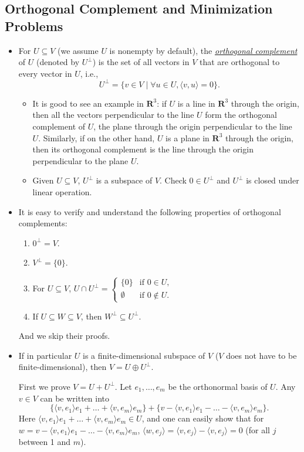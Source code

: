 \documentclass{article}
\newcommand{\df}[1]{\ul{\textit{#1}}}
\newcommand{\R}{\mathbf{R}}
\newcommand{\inp}[2]{\langle #1, #2 \rangle}
\begin{document}
\subsection{Orthogonal Complement and Minimization Problems}
\begin{itemize}
    \item For $U \subseteq V$ (we assume $U$ is nonempty by default), the \df{orthogonal complement} of $U$ (denoted by $U^\perp$) is the set of all vectors in $V$ that are orthogonal to every vector in $U$, i.e., $$U^\perp = \{v \in V \mid \forall u \in U, \inp{v}{u}=0\}.$$
    \begin{itemize}
        \item It is good to see an example in $\R^3$: if $U$ is a line in $\R^3$ through the origin, then all the vectors perpendicular to the line $U$ form the orthogonal complement of $U$, the plane through the origin perpendicular to the line $U$. Similarly, if on the other hand, $U$ is a plane in $\R^3$ through the origin, then its orthogonal complement is the line through the origin perpendicular to the plane $U$.
        \item Given $U \subseteq V$, $U^\perp$ is a subspace of $V$. Check $0 \in U^\perp$ and $U^\perp$ is closed under linear operation.
    \end{itemize}
    \item It is easy to verify and understand the following properties of orthogonal complements:
    \begin{enumerate}[label=(\alph*)]
        \item $0^\perp = V$.
        \item $V^\perp = \{0\}$.
        \item For $U \subseteq V$, $U \cap U^\perp = \left\{\begin{array}{rl} \{0\} & \text{if } 0 \in U, \\ \emptyset \;\, & \text{if } 0 \notin U. \end{array} \right.$
        \item If $U \subseteq W \subseteq V$, then $W^\perp \subseteq U^\perp$.
    \end{enumerate}
    And we skip their proofs.
    \item If in particular $U$ is a finite-dimensional subspace of $V$ ($V$ does not have to be finite-dimensional), then $V = U \oplus U^\perp$.
    
    First we prove $V = U + U^\perp$. Let $e_1,\dots,e_m$ be the orthonormal basis of $U$. Any $v \in V$ can be written into $$\{\inp{v}{e_1}e_1+\dots+\inp{v}{e_m}e_m\} + \{v - \inp{v}{e_1}e_1-\dots-\inp{v}{e_m}e_m\}.$$ Here $\inp{v}{e_1}e_1+\dots+\inp{v}{e_m}e_m \in U$, and one can easily show that for $w = v - \inp{v}{e_1}e_1-\dots-\inp{v}{e_m}e_m$, $\inp{w}{e_j} = \inp{v}{e_j} - \inp{v}{e_j} = 0$ (for all $j$ between 1 and $m$).
    

\end{itemize}
\end{document}
